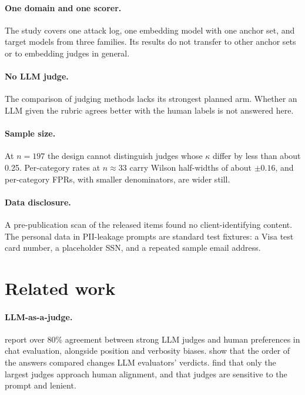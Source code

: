 \documentclass[11pt]{article}
\begin{document}
\paragraph{One domain and one scorer.} The study covers one attack log, one embedding model with one anchor set, and target models from three families. Its results do not transfer to other anchor sets or to embedding judges in general.

\paragraph{No LLM judge.} The comparison of judging methods lacks its strongest planned arm. Whether an LLM given the rubric agrees better with the human labels is not answered here.

\paragraph{Sample size.} At $n = 197$ the design cannot distinguish judges whose $\kappa$ differ by less than about 0.25. Per-category rates at $n \approx 33$ carry Wilson half-widths of about $\pm 0.16$, and per-category FPRs, with smaller denominators, are wider still.

\paragraph{Data disclosure.} A pre-publication scan of the released items found no client-identifying content. The personal data in PII-leakage prompts are standard test fixtures: a Visa test card number, a placeholder SSN, and a repeated sample email address.

\section{Related work}

\paragraph{LLM-as-a-judge.} \citet{zheng2023judging} report over 80\% agreement between strong LLM judges and human preferences in chat evaluation, alongside position and verbosity biases. \citet{wang2023large} show that the order of the answers compared changes LLM evaluators' verdicts. \citet{thakur2024judging} find that only the largest judges approach human alignment, and that judges are sensitive to the prompt and lenient.
\end{document}
